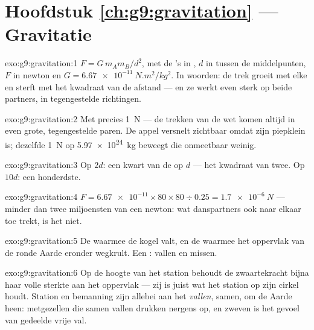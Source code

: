 \section*{Hoofdstuk \ref{ch:g9:gravitation} --- Gravitatie}

\begin{solution}{exo:g9:gravitation:1}
$F = G \, m_A m_B / d^2$, met de 's in
, $d$ in  tussen de middelpunten,
$F$ in newton en $G = \qty{6.67e-11}{N.m^2/kg^2}$. In woorden: de trek
groeit met elke  en sterft met het kwadraat van de afstand
--- en ze werkt even sterk op beide partners, in tegengestelde
richtingen.
\end{solution}

\begin{solution}{exo:g9:gravitation:2}
Met precies \qty{1}{N} --- de trekken van de wet komen altijd in even
grote, tegengestelde paren. De appel versnelt zichtbaar omdat zijn
 piepklein is; dezelfde \qty{1}{N} op \qty{5.97e24}{kg}
 beweegt die onmeetbaar weinig.
\end{solution}

\begin{solution}{exo:g9:gravitation:3}
Op $2d$: een kwart van de  op $d$ --- het kwadraat van
twee. Op $10d$: een honderdste.
\end{solution}

\begin{solution}{exo:g9:gravitation:4}
$F = \num{6.67e-11} \times 80 \times 80 \div 0.25 = \qty{1.7e-6}{N}$
--- minder dan twee miljoensten van een newton: wat danspartners ook
naar elkaar toe trekt,  is het niet.
\end{solution}

\begin{solution}{exo:g9:gravitation:5}
De  waarmee de kogel valt, en de  waarmee het oppervlak
van de ronde Aarde eronder wegkrult. Een : vallen en
missen.
\end{solution}

\begin{solution}{exo:g9:gravitation:6}
Op de hoogte van het station behoudt de zwaartekracht bijna haar volle
sterkte aan het oppervlak --- zij is juist wat het station op zijn
cirkel houdt. Station en bemanning zijn allebei aan het \emph{vallen},
samen, om de Aarde heen: metgezellen die samen vallen drukken nergens
op, en zweven is het gevoel van gedeelde vrije val.
\end{solution}

